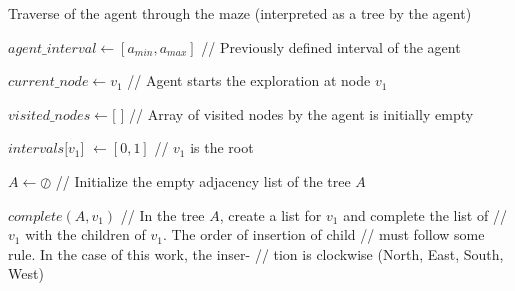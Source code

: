 \begin{algorithm}
\caption{Traverse of the agent through the maze (interpreted as a tree by the agent)}
\label{pseudocode_1}
\begin{algorithmic}

\State $agent\_interval \gets [a_{min},a_{max}]$ \hspace{0.5cm} \slash\slash \hspace{0.1cm} Previously defined interval of the agent

\State $current\_node \gets v_{1}$ \hspace{1cm} \slash\slash \hspace{0.1cm} Agent starts the exploration at node $v_{1}$

\State $visited\_nodes \gets [$ $]$ \hspace{0.95cm} \slash\slash \hspace{0.1cm} Array of visited nodes by the agent is initially empty

\State $intervals[v_{1}$] $\gets [0,1]$ \hspace{0.65cm} \slash\slash \hspace{0.1cm} $v_{1}$ is the root


\State $A \gets \oslash$ \hspace{3.1cm} \slash\slash \hspace{0.1cm} Initialize the empty adjacency list of the tree $A$

\State $complete(A, v_{1})$ \hspace{1.55cm} \slash\slash \hspace{0.1cm} In the tree $A$, create a list for $v_{1}$ and complete the list of
\State \hspace{4.45cm} \slash\slash \hspace{0.1cm} $v_{1}$ with the children of $v_{1}$. The order of insertion of child
\State \hspace{4.45cm} \slash\slash \hspace{0.1cm} must follow some rule. In the case of this work, the inser-
\State \hspace{4.45cm} \slash\slash \hspace{0.1cm} tion is clockwise (North, East, South, West)\\


\end{algorithmic}
\end{algorithm}
